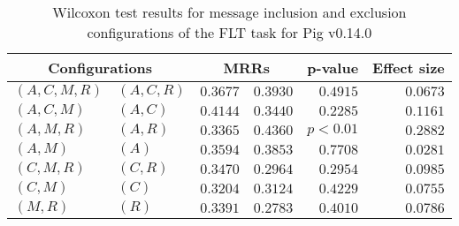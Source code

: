 
\begin{table}
\begin{spacing}{1.2}
\centering
\caption{Wilcoxon test results for message inclusion and exclusion configurations of the FLT task for Pig v0.14.0}
\label{table:versus-wilcox-pig-flt-message}
\begin{tabular}{ll|rr|rr}
\toprule
      \multicolumn{2}{c|}{Configurations} &          \multicolumn{2}{c|}{MRRs} &       p-value & Effect size \\
\midrule
 $(A,C,M,R)$ &  $(A,C,R)$ & $0.3677$ & $0.3930$ & $0.4915$ &    $0.0673$ \\
   $(A,C,M)$ &    $(A,C)$ & $0.4144$ & $0.3440$ & $0.2285$ &    $0.1161$ \\
   $(A,M,R)$ &    $(A,R)$ & $0.3365$ & $0.4360$ & $p<0.01$ &    $0.2882$ \\
     $(A,M)$ &      $(A)$ & $0.3594$ & $0.3853$ & $0.7708$ &    $0.0281$ \\
   $(C,M,R)$ &    $(C,R)$ & $0.3470$ & $0.2964$ & $0.2954$ &    $0.0985$ \\
     $(C,M)$ &      $(C)$ & $0.3204$ & $0.3124$ & $0.4229$ &    $0.0755$ \\
     $(M,R)$ &      $(R)$ & $0.3391$ & $0.2783$ & $0.4010$ &    $0.0786$ \\
\bottomrule
\end{tabular}

\end{spacing}
\end{table}

